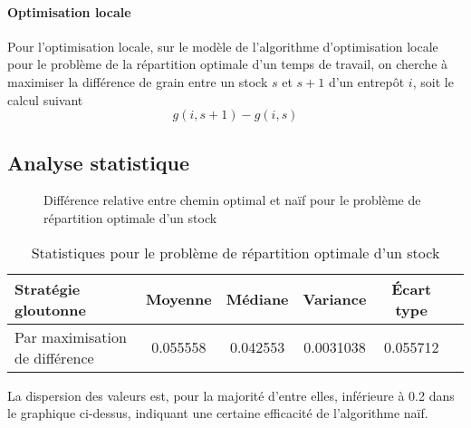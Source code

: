\documentclass[a4paper,english,french]{article}
\begin{document}
\paragraph*{Optimisation locale} Pour l'optimisation locale, sur le modèle de l'algorithme d'optimisation locale pour le problème de la répartition optimale d'un temps de travail, on cherche à maximiser la différence de grain entre un stock $s$ et $s + 1$ d'un entrepôt $i$, soit le calcul suivant \[ g(i, s + 1) - g(i, s) \]

\subsection*{Analyse statistique}

\begin{figure}
\centering
{}
\caption{Différence relative entre chemin optimal et naïf pour le problème de répartition optimale d'un stock}
\end{figure}

\begin{center}
\begin{table}[htbp]
    \centering
    \begin{tabular}{lccccc}
        \toprule
        Stratégie gloutonne             & Moyenne   & Médiane   & Variance      & Écart type    \\
        \midrule
        Par maximisation de différence  & 0.055558 & 0.042553 & 0.0031038    & 0.055712      \\
        \bottomrule
    \end{tabular}
    \caption{Statistiques pour le problème de répartition optimale d'un stock}
\end{table}
\end{center}

La dispersion des valeurs est, pour la majorité d'entre elles, inférieure à 0.2 dans le graphique ci-dessus, indiquant une certaine efficacité de l'algorithme naïf.
\end{document}
